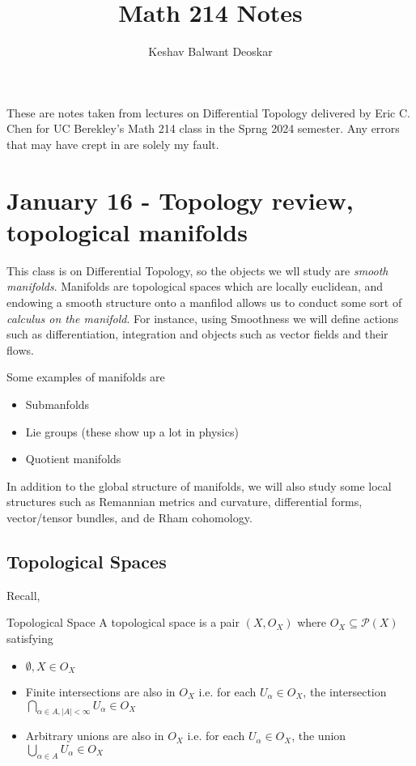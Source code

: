 \documentclass{article}
\title{Math 214 Notes}
\author{Keshav Balwant Deoskar}
\begin{document}
\maketitle

These are notes taken from lectures on Differential Topology delivered by Eric C. Chen for UC Berekley's Math 214 class in the Sprng 2024 semester. Any errors that may have crept in are solely my fault.

\tableofcontents

\pagebreak

\section{January 16 - Topology review, topological manifolds}

This class is on Differential Topology, so the objects we wll study are \emph{smooth manifolds}. Manifolds are topological spaces which are locally euclidean, and endowing a smooth structure onto a manfilod allows us to conduct some sort of \emph{calculus on the manifold}. For instance, using Smoothness we will define actions such as differentiation, integration and objects such as vector fields and their flows.

\vskip 0.5cm
Some examples of manifolds are
\begin{itemize}
  \item Submanfolds
  \item Lie groups (these show up a lot in physics)
  \item Quotient manifolds
\end{itemize}

\vskip 0.5cm
In addition to the global structure of manifolds, we will also study some local structures such as Remannian metrics and curvature, differential forms, vector/tensor bundles, and de Rham cohomology.

\subsection{Topological Spaces}
Recall,

\begin{mathdefinitionbox}{Topological Space}
\vskip 0.25cm
  A topological space is a pair $(X, O_X)$ where $O_X \subseteq \mathcal P (X)$ satisfying 
\begin{itemize}
  \item $\emptyset, X \in O_X$
  \item Finite intersections are also in $O_X$ i.e. for each $U_{\alpha} \in O_X$, the intersection $\bigcap_{\alpha \in A, |A| < \infty} U_{\alpha} \in O_X$ 
  \item Arbitrary unions are also in $O_X$ i.e. for each $U_{\alpha} \in O_X$, the union $\bigcup_{\alpha \in A} U_{\alpha} \in O_X$ 
\end{itemize}
\end{mathdefinitionbox}
\end{document}
